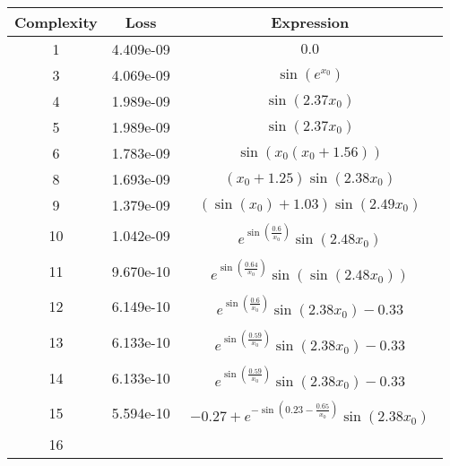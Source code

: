 \begin{center}
        \begin{tabular}{|c|c|c|}
        \hline
        Complexity & Loss & Expression \\
        \hline
        1 & 4.409e-09 & $\begin{aligned}0.0\end{aligned}$\\ \hline3 & 4.069e-09 & $\begin{aligned}\sin{\left(e^{x_{0}} \right)}\end{aligned}$\\ \hline4 & 1.989e-09 & $\begin{aligned}\sin{\left(2.37 x_{0} \right)}\end{aligned}$\\ \hline5 & 1.989e-09 & $\begin{aligned}\sin{\left(2.37 x_{0} \right)}\end{aligned}$\\ \hline6 & 1.783e-09 & $\begin{aligned}\sin{\left(x_{0} \left(x_{0} + 1.56\right) \right)}\end{aligned}$\\ \hline8 & 1.693e-09 & $\begin{aligned}\left(x_{0} + 1.25\right) \sin{\left(2.38 x_{0} \right)}\end{aligned}$\\ \hline9 & 1.379e-09 & $\begin{aligned}\left(\sin{\left(x_{0} \right)} + 1.03\right) \sin{\left(2.49 x_{0} \right)}\end{aligned}$\\ \hline10 & 1.042e-09 & $\begin{aligned}e^{\sin{\left(\frac{0.6}{x_{0}} \right)}} \sin{\left(2.48 x_{0} \right)}\end{aligned}$\\ \hline11 & 9.670e-10 & $\begin{aligned}e^{\sin{\left(\frac{0.64}{x_{0}} \right)}} \sin{\left(\sin{\left(2.48 x_{0} \right)} \right)}\end{aligned}$\\ \hline12 & 6.149e-10 & $\begin{aligned}e^{\sin{\left(\frac{0.6}{x_{0}} \right)}} \sin{\left(2.38 x_{0} \right)} - 0.33\end{aligned}$\\ \hline13 & 6.133e-10 & $\begin{aligned}e^{\sin{\left(\frac{0.59}{x_{0}} \right)}} \sin{\left(2.38 x_{0} \right)} - 0.33\end{aligned}$\\ \hline14 & 6.133e-10 & $\begin{aligned}e^{\sin{\left(\frac{0.59}{x_{0}} \right)}} \sin{\left(2.38 x_{0} \right)} - 0.33\end{aligned}$\\ \hline15 & 5.594e-10 & $\begin{aligned}-0.27 + e^{- \sin{\left(0.23 - \frac{0.65}{x_{0}} \right)}} \sin{\left(2.38 x_{0} \right)}\end{aligned}$\\ \hline16 
\end{tabular}
\end{center}
